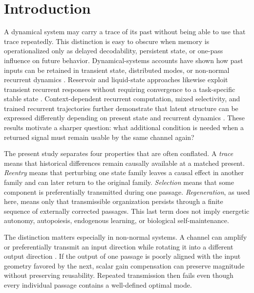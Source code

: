 \documentclass[aps,pre,preprint,superscriptaddress,nofootinbib]{revtex4-2}
\begin{document}
\maketitle

\section{Introduction}

A dynamical system may carry a trace of its past without being able to use that trace repeatedly. This distinction is easy to obscure when memory is operationalized only as delayed decodability, persistent state, or one-pass influence on future behavior. Dynamical-systems accounts have shown how past inputs can be retained in transient state, distributed modes, or non-normal recurrent dynamics \cite{Ganguli2008,Goldman2009,Trefethen2005}. Reservoir and liquid-state approaches likewise exploit transient recurrent responses without requiring convergence to a task-specific stable state \cite{Maass2002,JaegerHaas2004,Lukosevicius2009}. Context-dependent recurrent computation, mixed selectivity, and trained recurrent trajectories further demonstrate that latent structure can be expressed differently depending on present state and recurrent dynamics \cite{Mante2013,Rigotti2013,Sussillo2009,Laje2013}. These results motivate a sharper question: what additional condition is needed when a returned signal must remain usable by the same channel again?

The present study separates four properties that are often conflated. A \emph{trace} means that historical differences remain causally available at a matched present. \emph{Reentry} means that perturbing one state family leaves a causal effect in another family and can later return to the original family. \emph{Selection} means that some component is preferentially transmitted during one passage. \emph{Regeneration}, as used here, means only that transmissible organization persists through a finite sequence of externally corrected passages. This last term does not imply energetic autonomy, autopoiesis, endogenous learning, or biological self-maintenance.

The distinction matters especially in non-normal systems. A channel can amplify or preferentially transmit an input direction while rotating it into a different output direction \cite{Trefethen2005,Hennequin2014}. If the output of one passage is poorly aligned with the input geometry favored by the next, scalar gain compensation can preserve magnitude without preserving reusability. Repeated transmission then fails even though every individual passage contains a well-defined optimal mode.
\end{document}
